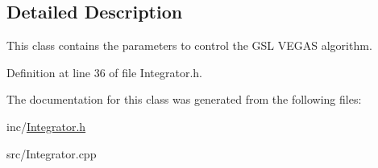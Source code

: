 \subsection{Detailed Description}
This class contains the parameters to control the G\+S\+L V\+E\+G\+A\+S algorithm. 

Definition at line 36 of file Integrator.\+h.



The documentation for this class was generated from the following files\+:\begin{DoxyCompactItemize}
\item 
inc/\hyperlink{Integrator_8h}{Integrator.\+h}\item 
src/Integrator.\+cpp\end{DoxyCompactItemize}
